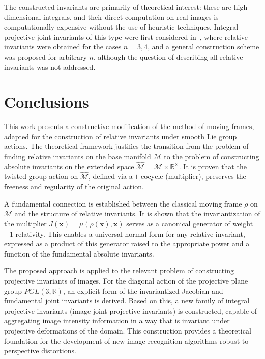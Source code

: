\documentclass[12pt,reqno]{amsart}
\begin{document}
\medskip

The constructed invariants are primarily of theoretical interest: these are high-dimensional integrals, and their direct computation on real images is computationally expensive without the use of heuristic techniques. 
Integral projective joint invariants of this type were first considered in~\cite{Suk2000}, where relative invariants were obtained for the cases $n=3,4$, and a general construction scheme was proposed for arbitrary $n$, although the question of describing all relative invariants was not addressed.


\section{Conclusions}

This work presents a constructive modification of the method of moving frames, adapted for the construction of relative invariants under smooth Lie group actions. The theoretical framework justifies the transition from the problem of finding relative invariants on the base manifold $\mathcal{M}$ to the problem of constructing absolute invariants on the extended space $\widehat{\mathcal{M}} = \mathcal{M} \times \mathbb{R}^\times$. It is proven that the twisted group action on $\widehat{\mathcal{M}}$, defined via a $1$-cocycle (multiplier), preserves the freeness and regularity of the original action.

A fundamental connection is established between the classical moving frame $\rho$ on $\mathcal{M}$ and the structure of relative invariants. It is shown that the invariantization of the multiplier $J(\boldsymbol{x}) = \mu(\rho(\boldsymbol{x}), \boldsymbol{x})$ serves as a canonical generator of weight $-1$ relativity. This enables a universal normal form for any relative invariant, expressed as a product of this generator raised to the appropriate power and a function of the fundamental absolute invariants.

The proposed approach is applied to the relevant problem of constructing projective invariants of images. For the diagonal action of the projective plane group $PGL(3, \mathbb{R})$, an explicit form of the invariantized Jacobian and fundamental joint invariants is derived. Based on this, a new family of integral projective invariants (image joint projective invariants) is constructed, capable of aggregating image intensity information in a way that is invariant under projective deformations of the domain. This construction provides a theoretical foundation for the development of new image recognition algorithms robust to perspective distortions.
\end{document}
